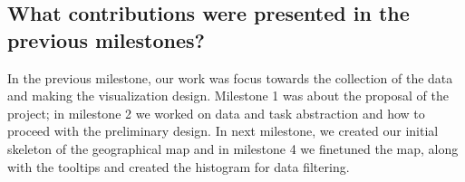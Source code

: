 \subsection{What contributions were presented in the previous milestones?}

In the previous milestone, our work was focus towards the collection of the data and making the visualization design. Milestone 1 was about the proposal of the project; in milestone 2 we worked on data and task abstraction and how to proceed with the preliminary design. In next milestone, we created our initial skeleton of the geographical map and in milestone 4 we finetuned the map, along with the tooltips and created the histogram for data filtering.


